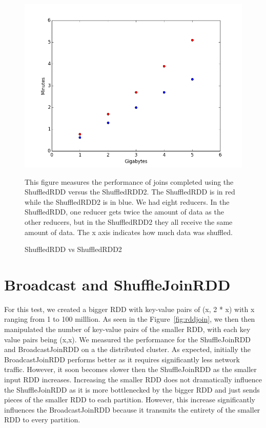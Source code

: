 \begin{figure}[h]
\begin{center}
\includegraphics[scale=0.6]{./img/distributedshuffle.png}
\caption{ShuffledRDD vs ShuffledRDD2}
\label{fig:distributed}
\end{center}
This figure measures the performance of joins completed using the ShuffledRDD versus the ShuffledRDD2.
The ShuffledRDD is in red while the ShuffledRDD2 is in blue. We had eight reducers. In the ShuffledRDD, one reducer gets twice the amount of
data as the other reducers, but in the ShuffledRDD2 they all receive the same amount of data. The x axis indicates how much data was
shuffled.  
\end{figure}


\section{Broadcast and ShuffleJoinRDD}

For this test, we created a bigger RDD with key-value pairs of (x, 2 * x) with x ranging from 1 to 100 milllion.
As seen in the Figure~\ref{fig:rddjoin}, we then then manipulated the number of key-value pairs of the smaller RDD, 
with each key value pairs being (x,x). We measured the performance for the ShuffleJoinRDD and BroadcastJoinRDD on a
the distributed cluster. 
As expected, initially the BroadcastJoinRDD performs better as it requires significantly less network traffic.
However, it soon becomes slower then the ShuffleJoinRDD as the smaller input RDD increases.
Increasing the smaller RDD does not dramatically influence the ShuffleJoinRDD as it is more bottlenecked by the bigger RDD and just
sends pieces of the smaller RDD to each partition. However, this increase significantly influences the BroadcastJoinRDD 
because it transmits the entirety of the smaller RDD to every partition.

